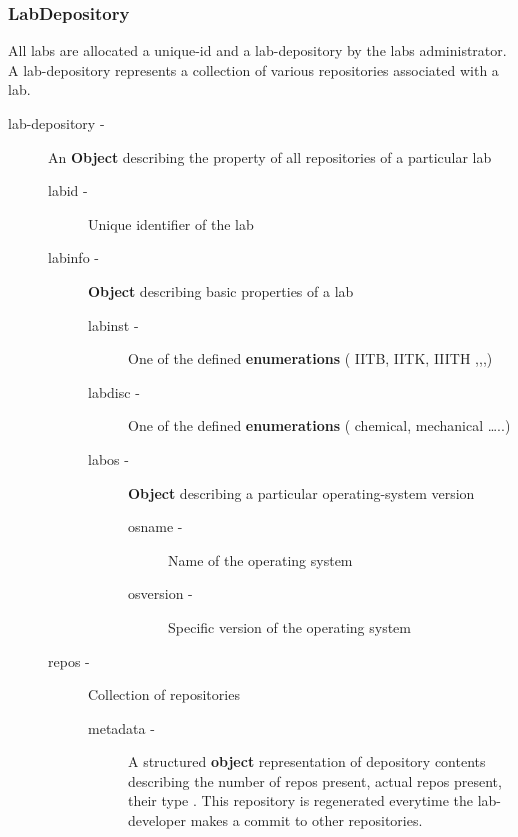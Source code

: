 \documentclass[11pt]{article}
\begin{document}
\subsubsection{LabDepository}
\label{sec-3.3.1}


     All labs are allocated a unique-id and a lab-depository by the
     labs administrator. A lab-depository represents a collection of
     various repositories associated with a lab.

\begin{description}
\item [lab-depository -] An \textbf{Object} describing the property of all
                    repositories of a particular lab

\begin{description}
\item [labid -] Unique identifier of the lab
\item [labinfo -] \textbf{Object} describing basic properties of a lab

\begin{description}
\item [labinst -] One of the defined \textbf{enumerations} ( IITB, IITK, IIITH ,,,)
\item [labdisc -] One of the defined \textbf{enumerations} ( chemical, mechanical \ldots{}..)
\item [labos -] \textbf{Object} describing a particular operating-system version

\begin{description}
\item [osname -] Name of the operating system
\item [osversion -] Specific version of the operating system
\end{description}

\end{description}

\item [repos -] Collection of repositories

\begin{description}
\item [metadata -]  A structured \textbf{object} representation of
                           depository contents describing the number
                           of repos present, actual repos present,
                           their type . This repository is regenerated
                           everytime the lab-developer makes a commit
                           to other repositories.


\end{description}
\end{description}
\end{description}
\end{document}
